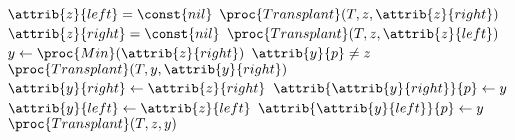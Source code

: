 \begin{codebox}
\li \If $\attrib{z}{left} = \const{nil}$
\li \Then
        $\proc{Transplant}(T,z,\attrib{z}{right})$
\li \Else \If $\attrib{z}{right} = \const{nil}$
\li     $\proc{Transplant}(T,z,\attrib{z}{left})$
\li \Else
\li     $y \gets \proc{Min}(\attrib{z}{right})$
\li     \If $\attrib{y}{p} \neq z$
\li     \Then
            $\proc{Transplant}(T, y, \attrib{y}{right})$
\li         $\attrib{y}{right} \gets \attrib{z}{right}$
\li         $\attrib{\attrib{y}{right}}{p} \gets y$
        \End
\li     $\attrib{y}{left} \gets \attrib{z}{left}$
\li     $\attrib{\attrib{y}{left}}{p} \gets y$
\li     $\proc{Transplant}(T,z,y)$
    \End
\end{codebox}